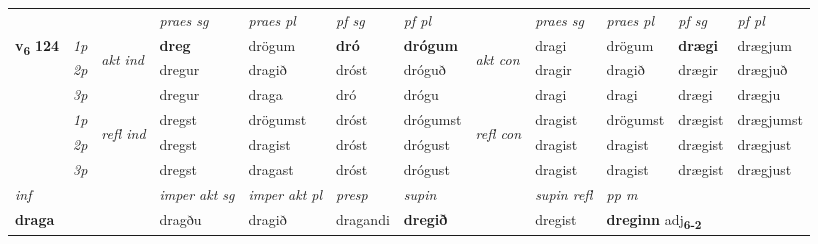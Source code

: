 \begin{longtable}[l]{X>{\footnotesize\itshape}llXXXXlXXXX}
 & &   & \textit{praes sg}  & \textit{praes pl}    & \textit{ pf sg} & \textit{pf pl} & & \textit{praes sg}  & \textit{praes pl}    & \textit{pf sg} & \textit{pf pl }  \\ \cmidrule{4-7} \cmidrule{9-12}
 \multirow{2}{*}{{{\textbf{v{\textsubscript{6}}} \Large{\textbf{124}}}}}  & 1p & \multirow{3}{*}{\begin{turn}{90}\textit{akt ind}\end{turn}} & \textbf{dreg} & drögum & \textbf{dró} & \textbf{drógum} & \multirow{3}{*}{\begin{turn}{90}\textit{akt con}\end{turn}} &dragi & drögum & \textbf{drægi} & drægjum\\*
 & 2p &  &  dregur  & dragið & dróst & dróguð & & dragir & dragið & drægir & drægjuð \\*
 & 3p &  & dregur & draga & dró & drógu & & dragi & dragi& drægi & drægju \\*
\cmidrule{4-7} \cmidrule{9-12}
 & 1p & \multirow{3}{*}{\begin{turn}{90}\textit{refl ind}\end{turn}}  & dregst & drögumst & dróst & drógumst & \multirow{3}{*}{\begin{turn}{90}\textit{refl con}\end{turn}}  &dragist & drögumst & drægist & drægjumst \\*
 & 2p &  & dregst & dragist & dróst & drógust & &dragist & dragist & drægist & drægjust \\*
 & 3p  & & dregst & dragast & dróst & drógust & & dragist & dragist& drægist & drægjust \\*
\cmidrule{4-7} \cmidrule{9-12}

   {\textit{inf}} & &  & \textit{imper akt sg} & \textit{imper akt pl}   & \textit{presp} & \textit{supin} && \textit{supin refl} & \textit{pp m} \\*
  {\textbf{draga}} & && dragðu  & dragið   & dragandi &  \textbf{dregið} && dregist & \multicolumn{2}{l}{\textbf{dreginn} adj\textbf{\textsubscript{6-2}}} \\*

\midrule


\end{longtable}
